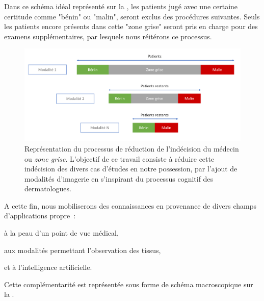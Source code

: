 Dans ce schéma idéal représenté sur la , les patients jugé avec une certaine certitude comme "bénin" ou "malin", seront exclus des procédures suivantes. Seuls les patients encore présents dans cette "zone grise" seront pris en charge pour des examens supplémentaires, par lesquels nous réitérons ce processus.\par 

\begin{figure}[H]
    \centering
    \includegraphics[width=\linewidth]{contents/i_introduction/resources/scheme_reduce_indecision.pdf}
    \caption{Représentation du processus de réduction de l'indécision du médecin ou \textit{zone grise}. L'objectif de ce travail consiste à réduire cette indécision des divers cas d'études en notre possession, par l'ajout de modalités d'imagerie en s'inspirant du processus cognitif des dermatologues.}
    \label{fig:scheme_reduce_indecision}
\end{figure}\par

A cette fin, nous mobiliserons des connaissances en provenance de divers champs d'applications propre~:
\begin{inlinerate}
    \item à la peau d'un point de vue médical, 
    \item aux modalités permettant l'observation des tissus,
    \item et à l'intelligence artificielle.
\end{inlinerate} Cette complémentarité est représentée sous forme de schéma macroscopique sur la .\par

